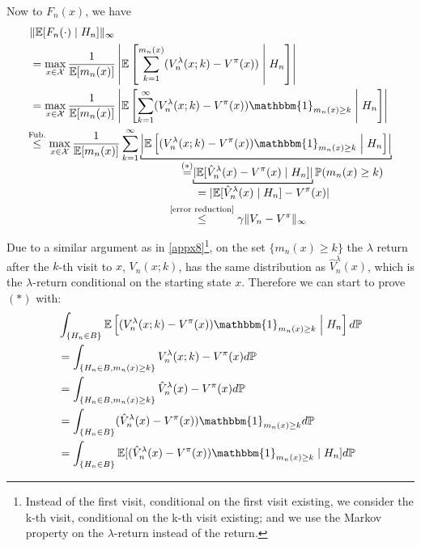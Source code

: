Now to \(F_n(x)\), we have
\begin{align*}
    &\|\E[F_n(\cdot)\mid H_n]\|_\infty\\
    &= \max_{x\in\cX}\frac{1}{\E[m_n(x)]}
    \left| \E\left[\sum_{k=1}^{m_n(x)}(V_n^\lambda(x;k)-V^\pi(x)) \;\middle|\; H_n \right]\right| \\
    &= \max_{x\in\cX}\frac{1}{\E[m_n(x)]}
    \left| \E\left[\sum_{k=1}^\infty (V_n^\lambda(x;k)-V^\pi(x))\mathbbm{1}_{m_n(x)\ge k} \;\middle|\; H_n \right]\right|\\
    &\lxlq{\text{Fub.}} \max_{x\in\cX}\frac{1}{\E[m_n(x)]}
    \sum_{k=1}^\infty 
    \underbracket[0.7pt]{
        \left| \E\left[ (V_n^\lambda(x;k)-V^\pi(x))\mathbbm{1}_{m_n(x)\ge k} \;\middle|\; H_n \right]\right|
    }_{
    \mathclap{
        \qquad\quad\lxeq{(*)} \underbracket[0.7pt]{
            |\E[ \hat{V}^\lambda_n(x)- V^\pi(x)\mid H_n]|
        }_{
        \mathclap{
            \begin{aligned}[t]\scriptsize
                \qquad&=|\E[\hat{V}_n^\lambda(x)\mid H_n]-V^\pi(x)|\\
                &\lxlq{\text{\ref{error reduction}}}\gamma \|V_n-V^\pi\|_\infty
            \end{aligned}
        }
        }
        \textstyle \Pr(m_n(x)\ge k)
    }
    }
\end{align*}
Due to a similar argument as in \ref{appx8}\footnote{Instead of the first visit, conditional on the first visit existing, we consider the k-th visit, conditional on the k-th visit existing; and we use the Markov property on the \(\lambda\)-return instead of the return.}, on the set \(\{m_n(x)\ge k\}\) the \(\lambda\) return after the \(k\)-th visit to \(x\), \(V_n(x;k)\), has the same distribution as \(\hat{V}_n^\lambda(x)\), which is the \(\lambda\)-return conditional on the starting state \(x\). Therefore we can start to prove \((*)\) with:
\begin{align*}
    &\int_{\{H_n\in B\}} \E\left[ (V_n^\lambda(x;k)-V^\pi(x))\mathbbm{1}_{m_n(x)\ge k} \;\middle|\; H_n \right]d\Pr\\
    &= \int_{\{H_n\in B, m_n(x)\ge k\}} V_n^\lambda(x;k)-V^\pi(x)d\Pr\\
    &=\int_{\{H_n\in B,m_n(x)\ge k\}} \hat{V}_n^\lambda(x)-V^\pi(x)d\Pr\\
    &=\int_{\{H_n\in B\}} (\hat{V}_n^\lambda(x)-V^\pi(x)) \mathbbm{1}_{m_n(x)\ge k}d\Pr\\
    &=\int_{\{H_n\in B\}} \E[(\hat{V}_n^\lambda(x)-V^\pi(x)) \mathbbm{1}_{m_n(x)\ge k}\mid H_n] d\Pr
\end{align*}
